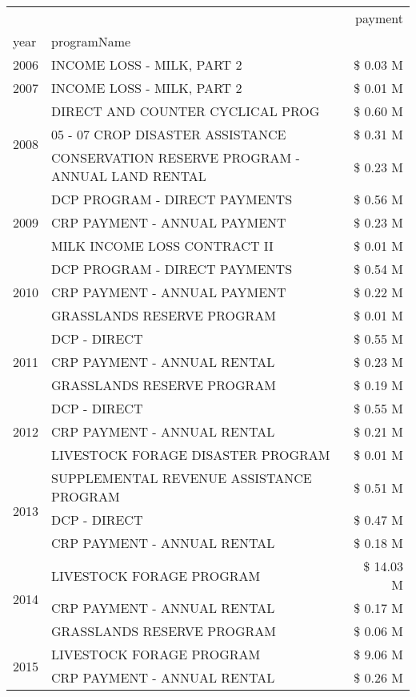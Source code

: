 \begin{tabular}{llr}
\toprule
 &  & payment \\
year & programName &  \\
\midrule
2006 & INCOME LOSS - MILK, PART 2 & \$ 0.03 M \\
\cline{1-3}
2007 & INCOME LOSS - MILK, PART 2 & \$ 0.01 M \\
\cline{1-3}
\multirow[t]{3}{*}{2008} & DIRECT AND COUNTER CYCLICAL PROG & \$ 0.60 M \\
 & 05 - 07 CROP DISASTER ASSISTANCE & \$ 0.31 M \\
 & CONSERVATION RESERVE PROGRAM - ANNUAL LAND RENTAL & \$ 0.23 M \\
\cline{1-3}
\multirow[t]{3}{*}{2009} & DCP PROGRAM - DIRECT PAYMENTS & \$ 0.56 M \\
 & CRP PAYMENT - ANNUAL PAYMENT & \$ 0.23 M \\
 & MILK INCOME LOSS CONTRACT II & \$ 0.01 M \\
\cline{1-3}
\multirow[t]{3}{*}{2010} & DCP PROGRAM - DIRECT PAYMENTS & \$ 0.54 M \\
 & CRP PAYMENT - ANNUAL PAYMENT & \$ 0.22 M \\
 & GRASSLANDS RESERVE PROGRAM & \$ 0.01 M \\
\cline{1-3}
\multirow[t]{3}{*}{2011} & DCP - DIRECT & \$ 0.55 M \\
 & CRP PAYMENT - ANNUAL RENTAL & \$ 0.23 M \\
 & GRASSLANDS RESERVE PROGRAM & \$ 0.19 M \\
\cline{1-3}
\multirow[t]{3}{*}{2012} & DCP - DIRECT & \$ 0.55 M \\
 & CRP PAYMENT - ANNUAL RENTAL & \$ 0.21 M \\
 & LIVESTOCK FORAGE DISASTER PROGRAM & \$ 0.01 M \\
\cline{1-3}
\multirow[t]{3}{*}{2013} & SUPPLEMENTAL REVENUE ASSISTANCE PROGRAM & \$ 0.51 M \\
 & DCP - DIRECT & \$ 0.47 M \\
 & CRP PAYMENT - ANNUAL RENTAL & \$ 0.18 M \\
\cline{1-3}
\multirow[t]{3}{*}{2014} & LIVESTOCK FORAGE PROGRAM & \$ 14.03 M \\
 & CRP PAYMENT - ANNUAL RENTAL & \$ 0.17 M \\
 & GRASSLANDS RESERVE PROGRAM & \$ 0.06 M \\
\cline{1-3}
\multirow[t]{3}{*}{2015} & LIVESTOCK FORAGE PROGRAM & \$ 9.06 M \\
 & CRP PAYMENT - ANNUAL RENTAL & \$ 0.26 M \\

\end{tabular}
